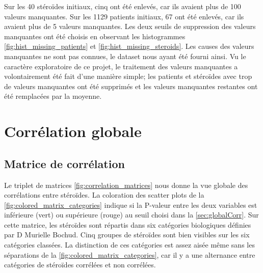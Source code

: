     Sur les 40 stéroïdes initiaux, cinq ont été enlevés, car ils avaient plus de 100 valeurs manquantes. Sur les 1129 patients initiaux, 67 ont été enlevés, car ils avaient plus de 5 valeurs manquantes. Les deux seuils de suppression des valeurs manquantes ont été choisis en observant les histogrammes \autoref{fig:hist_missing_patients} et \autoref{fig:hist_missing_steroids}. Les causes des valeurs manquantes ne sont pas connues, le dataset nous ayant été fourni ainsi. Vu le caractère exploratoire de ce projet, le traitement des valeurs manquantes a volontairement été fait d'une manière simple; les patients et stéroïdes avec trop de valeurs manquantes ont été supprimés et les valeurs manquantes restantes ont été remplacées par la moyenne.

\section{Corrélation globale}







\subsection{Matrice de corrélation}
    \label{sct:correlation_matrix}

    Le triplet de matrices \autoref{fig:correlation_matrices} nous donne la vue globale des corrélations entre stéroïdes. La coloration des scatter plots de la \autoref{fig:colored_matrix_categories} indique si la P-valeur entre les deux variables est inférieure (vert) ou supérieure (rouge) au seuil choisi dans la \autoref{sec:globalCorr}. Sur cette matrice, les stéroïdes sont répartis dans six catégories biologiques définies par D Murielle Bochud. Cinq groupes de stéroïdes sont bien visibles sur les six catégories classées. La distinction de ces catégories est assez aisée même sans les séparations de la \autoref{fig:colored_matrix_categories}, car il y a une alternance entre catégories de stéroïdes corrélées et non corrélées.

